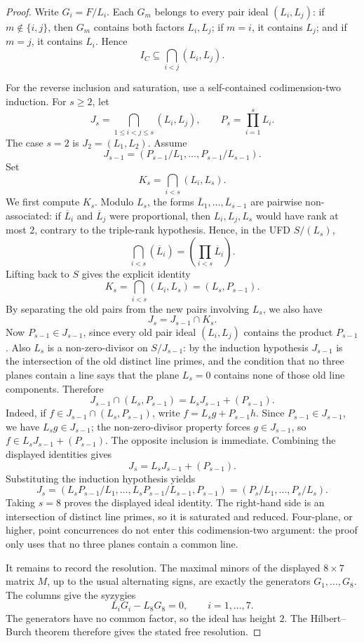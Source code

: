 \begin{proof}
Write \(G_i=F/L_i\).  Each \(G_m\) belongs to every pair ideal
\((L_i,L_j)\): if \(m\notin\{i,j\}\), then \(G_m\) contains both
factors \(L_i,L_j\); if \(m=i\), it contains \(L_j\); and if \(m=j\),
it contains \(L_i\).  Hence
\[
  I_C\subseteq \bigcap_{i<j}(L_i,L_j).
\]

For the reverse inclusion and saturation, use a self-contained
codimension-two induction.  For \(s\ge 2\), let
\[
  J_s=\bigcap_{1\le i<j\le s}(L_i,L_j),
  \qquad
  P_s=\prod_{i=1}^s L_i.
\]
The case \(s=2\) is \(J_2=(L_1,L_2)\).  Assume
\[
  J_{s-1}=(P_{s-1}/L_1,\ldots,P_{s-1}/L_{s-1}).
\]
Set
\[
  K_s=\bigcap_{i<s}(L_i,L_s).
\]
We first compute \(K_s\).  Modulo \(L_s\), the forms
\(\overline L_1,\ldots,\overline L_{s-1}\) are pairwise
non-associated: if \(\overline L_i\) and \(\overline L_j\) were
proportional, then \(L_i,L_j,L_s\) would have rank at most \(2\),
contrary to the triple-rank hypothesis.  Hence, in the UFD
\(S/(L_s)\),
\[
  \bigcap_{i<s}(\overline L_i)
  =
  \left(\prod_{i<s}\overline L_i\right).
\]
Lifting back to \(S\) gives the explicit identity
\[
  K_s
  =
  \bigcap_{i<s}(L_i,L_s)
  =
  (L_s,P_{s-1}).
\]
By separating the old pairs from the new pairs involving \(L_s\), we
also have
\[
  J_s=J_{s-1}\cap K_s.
\]
Now \(P_{s-1}\in J_{s-1}\), since every old pair ideal
\((L_i,L_j)\) contains the product \(P_{s-1}\).  Also \(L_s\) is a
non-zero-divisor on \(S/J_{s-1}\): by the induction hypothesis
\(J_{s-1}\) is the intersection of the old distinct line primes, and
the condition that no three planes contain a line says that the plane
\(L_s=0\) contains none of those old line components.  Therefore
\[
  J_{s-1}\cap(L_s,P_{s-1})=L_sJ_{s-1}+(P_{s-1}).
\]
Indeed, if \(f\in J_{s-1}\cap(L_s,P_{s-1})\), write
\(f=L_sg+P_{s-1}h\).  Since \(P_{s-1}\in J_{s-1}\), we have
\(L_sg\in J_{s-1}\); the non-zero-divisor property forces
\(g\in J_{s-1}\), so \(f\in L_sJ_{s-1}+(P_{s-1})\).  The opposite
inclusion is immediate.  Combining the displayed identities gives
\[
  J_s=L_sJ_{s-1}+(P_{s-1}).
\]
Substituting the induction hypothesis yields
\[
  J_s=
  (L_sP_{s-1}/L_1,\ldots,L_sP_{s-1}/L_{s-1},P_{s-1})
  =(P_s/L_1,\ldots,P_s/L_s).
\]
Taking \(s=8\) proves the displayed ideal identity.  The right-hand
side is an intersection of distinct line primes, so it is saturated and
reduced.  Four-plane, or higher, point concurrences do not enter this
codimension-two argument: the proof only uses that no three planes
contain a common line.

It remains to record the resolution.  The maximal minors of the
displayed \(8\times 7\) matrix \(M\), up to the usual alternating
signs, are exactly the generators \(G_1,\ldots,G_8\).  The columns give
the syzygies
\[
  L_iG_i-L_8G_8=0,\qquad i=1,\ldots,7.
\]
The generators have no common factor, so the ideal has height \(2\).
The Hilbert--Burch theorem therefore gives the stated free resolution.
\end{proof}

